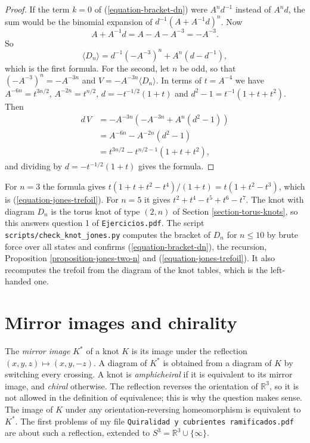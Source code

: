 \begin{proof}
If the term $k=0$ of
(\ref{equation-bracket-dn}) were
$A^{n}d^{-1}$ instead of $A^{n}d$, the
sum would be the binomial expansion of
$d^{-1}(A+A^{-1}d)^{n}$. Now
$$
A+A^{-1}d=A-A-A^{-3}=-A^{-3}.
$$
So
$$
\langle D_n\rangle
=d^{-1}(-A^{-3})^{n}
+A^{n}(d-d^{-1}),
$$
which is the first formula. For the
second, let $n$ be odd, so that
$(-A^{-3})^{n}=-A^{-3n}$ and
$V=-A^{-3n}\langle D_n\rangle$. In
terms of $t=A^{-4}$ we have
$A^{-6n}=t^{3n/2}$,
$A^{-2n}=t^{n/2}$,
$d=-t^{-1/2}(1+t)$ and
$d^{2}-1=t^{-1}(1+t+t^{2})$. Then
$$
\begin{aligned}
d\,V
&=-A^{-3n}
\left(-A^{-3n}+A^{n}(d^{2}-1)\right)\\
&=A^{-6n}-A^{-2n}(d^{2}-1)\\
&=t^{3n/2}-t^{n/2-1}(1+t+t^{2}),
\end{aligned}
$$
and dividing by $d=-t^{-1/2}(1+t)$
gives the formula.
\end{proof}

\noindent
For $n=3$ the formula gives
$t(1+t+t^{2}-t^{4})/(1+t)
=t(1+t^{2}-t^{3})$, which is
(\ref{equation-jones-trefoil}). For
$n=5$ it gives
$t^{2}+t^{4}-t^{5}+t^{6}-t^{7}$.
The knot with diagram $D_n$ is the
torus knot of type $(2,n)$ of
Section \ref{section-torus-knots}, so
this answers question 1 of
{\tt Ejercicios.pdf}.
The script
{\tt scripts/check\_knot\_jones.py}
computes the bracket of $D_n$ for
$n\leq 10$ by brute force over all
states and confirms
(\ref{equation-bracket-dn}), the
recursion,
Proposition \ref{proposition-jones-two-n}
and
(\ref{equation-jones-trefoil}). It also
recomputes the trefoil from the diagram
of the knot tables, which is the
left-handed one.

\section{Mirror images and chirality}
\label{section-chirality}

\noindent
The {\it mirror image} $K^{*}$ of a
knot $K$ is its image under the
reflection $(x,y,z)\mapsto(x,y,-z)$.
A diagram of $K^{*}$ is obtained from a
diagram of $K$ by switching every
crossing. A knot is
{\it amphicheiral} if it is equivalent
to its mirror image, and {\it chiral}
otherwise. The reflection reverses the
orientation of $\mathbb{R}^3$, so it is
not allowed in the definition of
equivalence; this is why the question
makes sense. The image of $K$ under any
orientation-reversing homeomorphism is
equivalent to $K^{*}$. The first
problems of my file
{\tt Quiralidad y cubrientes
ramificados.pdf} are about such a
reflection, extended to
$S^3=\mathbb{R}^3\cup\{\infty\}$.


